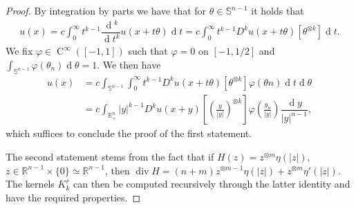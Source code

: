 \documentclass[a4paper,10pt]{amsart}
\newcommand{\R}{\mathbb R}
\newcommand{\dif}{\mathrm{d}}
\renewcommand{\dif}{\operatorname{d}\!}
\newcommand{\hold}{\operatorname{C}}
\numberwithin{equation}{section}
\theoremstyle{remark}
\numberwithin{equation}{section}
\begin{document}
	\begin{proof}
		By integration by parts we have that for $\theta\in\mathbb{S}^{n-1}$ it holds that
		\begin{align*}
			u(x)=c\int_0^\infty t^{k-1}\dfrac{\dif^k}{\dif t^k}u(x+t\theta)\dif t=c\int_0^\infty t^{k-1}D^ku(x+t\theta)\left[\theta^{\otimes k}\right]\dif t.
		\end{align*}
		We fix \(\varphi \in \hold^\infty ([-1, 1])\) such that \(\varphi = 0\) on \([-1, 1/2]\)
		and \(\int_{\mathbb{S}^{n - 1}} \varphi (\theta_n) \dif \theta = 1\).
		We then have 
		\begin{align*}
			u(x)&=c\int_{\mathbb{S}^{n-1}}\int_0^\infty t^{k-1}D^ku(x+t\theta)\left[\theta^{\otimes k}\right]\varphi(\theta n)\dif t\dif \theta\\
			&=c\int_{\R^n_+} |y|^{k-1}D^ku(x+y)\left[\left(\frac{y}{|y|}\right)^{\otimes k}\right]\varphi\left(\frac{y_n}{|y|}\right)\dfrac{\dif y}{|y|^{n-1}},
		\end{align*}
		which suffices to conclude the proof of the first statement.
		
		The second statement stems from the fact that if \(H (z) = z^{\otimes m} \eta (\vert z\vert)\), \(z \in \R^{n - 1} \times \{0\} \simeq \R^{n - 1}\), then \(\operatorname{div} H = (n + m) z^{\otimes m - 1} \eta (\vert z\vert) + z^{\otimes m} \eta' (\lvert z \rvert)\). The kernels \(K_k^r\) can then be computed recursively through the latter identity and have the required properties.  
	\end{proof}
	
\end{document}
